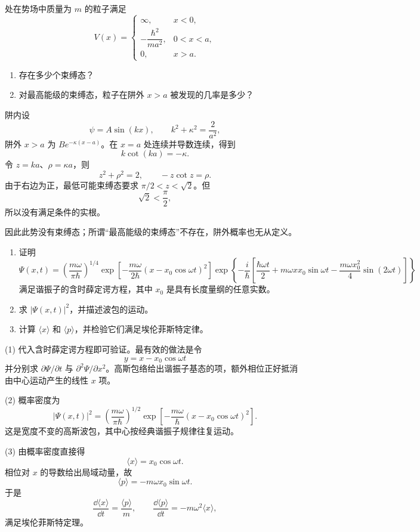 \begin{question}
处在势场中质量为 $m$ 的粒子满足
\[
V(x)=\begin{cases}\infty,&x<0,\\ -\dfrac{\hbar^2}{ma^2},&0<x<a,\\0,&x>a.
\end{cases}
\]
\begin{enumerate}
\item 存在多少个束缚态？
\item 对最高能级的束缚态，粒子在阱外 $x>a$ 被发现的几率是多少？
\end{enumerate}
\end{question}
\begin{solution}
阱内设
\[
\psi=A\sin(kx),
\qquad
k^2+\kappa^2=\frac{2}{a^2},
\]
阱外 $x>a$ 为 $Be^{-\kappa(x-a)}$。在 $x=a$ 处连续并导数连续，得到
\[
k\cot(ka)=-\kappa.
\]
令 $z=ka$、$\rho=\kappa a$，则
\[
z^2+\rho^2=2,
\qquad
-z\cot z=\rho.
\]
由于右边为正，最低可能束缚态要求 $\pi/2<z<\sqrt2$。但
\[
\sqrt2<\frac\pi2,
\]
所以没有满足条件的实根。

因此此势没有束缚态；所谓“最高能级的束缚态”不存在，阱外概率也无从定义。
\end{solution}

\begin{question}
\begin{enumerate}
\item 证明
\[
\Psi(x,t)=\left(\frac{m\omega}{\pi\hbar}\right)^{1/4}
\exp\!\left[-\frac{m\omega}{2\hbar}(x-x_0\cos\omega t)^2\right]
\exp\!\left\{-\frac{i}{\hbar}\left[\frac{\hbar\omega t}{2}+m\omega x x_0\sin\omega t-\frac{m\omega x_0^2}{4}\sin(2\omega t)\right]\right\}
\]
满足谐振子的含时薛定谔方程，其中 $x_0$ 是具有长度量纲的任意实数。
\item 求 $|\Psi(x,t)|^2$，并描述波包的运动。
\item 计算 $\langle x\rangle$ 和 $\langle p\rangle$，并检验它们满足埃伦菲斯特定律。
\end{enumerate}
\end{question}
\begin{solution}
(1) 代入含时薛定谔方程即可验证。最有效的做法是令
\[
y=x-x_0\cos\omega t
\]
并分别求 $\partial\Psi/\partial t$ 与 $\partial^2\Psi/\partial x^2$。高斯包络给出谐振子基态的项，额外相位正好抵消由中心运动产生的线性 $x$ 项。

(2) 概率密度为
\[
|\Psi(x,t)|^2=\left(\frac{m\omega}{\pi\hbar}\right)^{1/2}
\exp\left[-\frac{m\omega}{\hbar}(x-x_0\cos\omega t)^2\right].
\]
这是宽度不变的高斯波包，其中心按经典谐振子规律往复运动。

(3) 由概率密度直接得
\[
\langle x\rangle=x_0\cos\omega t.
\]
相位对 $x$ 的导数给出局域动量，故
\[
\langle p\rangle=-m\omega x_0\sin\omega t.
\]
于是
\[
\frac{\dd\langle x\rangle}{\dd t}=\frac{\langle p\rangle}{m},
\qquad
\frac{\dd\langle p\rangle}{\dd t}=-m\omega^2\langle x\rangle,
\]
满足埃伦菲斯特定理。
\end{solution}

